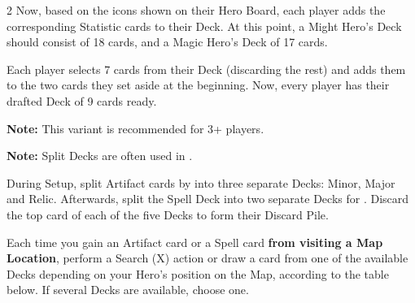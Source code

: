 \begin{multicols}{2}
Now, based on the icons shown on their Hero Board, each player adds the corresponding Statistic cards to their Deck.
At this point, a Might Hero's Deck should consist of 18 cards, and a Magic Hero's Deck of 17 cards.

Each player selects 7 cards from their Deck (discarding the rest) and adds them to the two cards they set aside at the beginning.
Now, every player has their drafted Deck of 9 cards ready.

\textbf{Note:} This variant is recommended for 3+ players.

\columnbreak
{}

\textbf{Note:} Split Decks are often used in .

During Setup, split Artifact cards by  into three separate Decks: Minor, Major and Relic.  %
Afterwards, split the Spell Deck into two separate Decks for .
Discard the top card of each of the five Decks to form their Discard Pile.

Each time you gain an Artifact card or a Spell card \textbf{from visiting a Map Location}, perform a Search (X) action or draw a card from one of the available Decks depending on your Hero's position on the Map, according to the table below.
If several Decks are available, choose one.

\begin{table}[H]
\end{table}


\end{multicols}
